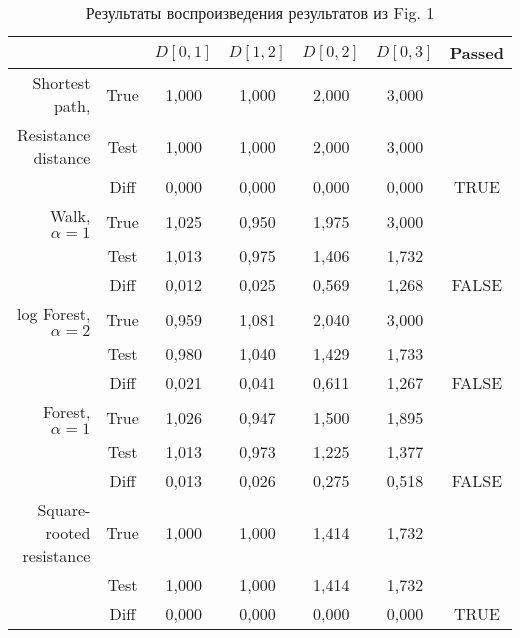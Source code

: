\documentclass{article}
\begin{document}
\begin{table}[H]
  \caption{Результаты воспроизведения результатов из Fig. 1}
  \begin{center}
    \begin{tabular}{rc|cccc|c}
                         &      & $D[0, 1]$ & $D[1, 2]$ & $D[0, 2]$ & $D[0, 3]$ & Passed \\
                         \hline
Shortest path,     & True & 1,000       & 1,000       & 2,000       & 3,000       &        \\
Resistance distance  & Test & 1,000       & 1,000       & 2,000       & 3,000       &        \\
                         & Diff & 0,000       & 0,000       & 0,000       & 0,000       & TRUE   \\
                         \hline
Walk, $\alpha=1$ & True & 1,025       & 0,950       & 1,975       & 3,000       &        \\
                         & Test & 1,013       & 0,975       & 1,406       & 1,732       &        \\
                         & Diff & 0,012       & 0,025       & 0,569       & 1,268       & FALSE  \\
                         \hline
log Forest, $\alpha=2$ & True & 0,959       & 1,081       & 2,040       & 3,000       &        \\
                         & Test & 0,980       & 1,040       & 1,429       & 1,733       &        \\
                         & Diff & 0,021       & 0,041       & 0,611       & 1,267       & FALSE  \\
                         \hline
Forest, $\alpha=1$ & True & 1,026       & 0,947       & 1,500       & 1,895       &        \\
                         & Test & 1,013       & 0,973       & 1,225       & 1,377       &        \\
                         & Diff & 0,013       & 0,026       & 0,275       & 0,518       & FALSE  \\
                         \hline
Square-rooted resistance & True & 1,000       & 1,000       & 1,414       & 1,732       &        \\
                         & Test & 1,000       & 1,000       & 1,414       & 1,732       &        \\
                         & Diff & 0,000       & 0,000       & 0,000       & 0,000       & TRUE   \\

\end{tabular}
\end{center}
\end{table}
\end{document}
